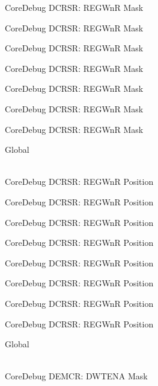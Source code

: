 \begin{DoxyRefList}
\label{deprecated__deprecated000130}%
%
Core\+Debug DCRSR\+: REGWnR Mask 

\label{deprecated__deprecated000186}%
%
Core\+Debug DCRSR\+: REGWnR Mask 

\label{deprecated__deprecated000269}%
%
Core\+Debug DCRSR\+: REGWnR Mask 

\label{deprecated__deprecated000328}%
%
Core\+Debug DCRSR\+: REGWnR Mask 

\label{deprecated__deprecated000404}%
%
Core\+Debug DCRSR\+: REGWnR Mask 

\label{deprecated__deprecated000493}%
%
Core\+Debug DCRSR\+: REGWnR Mask 

\label{deprecated__deprecated000595}%
%
Core\+Debug DCRSR\+: REGWnR Mask  
\item[{\parbox[t]{\linewidth}{Global \doxylink{group___c_m_s_i_s___core_debug_ga51e75942fc0614bc9bb2c0e96fcdda9a}{Core\+Debug\+\_\+\+DCRSR\+\_\+\+REGWn\+R\+\_\+\+Pos} }}]\hfill \\
\label{deprecated__deprecated000041}%
%
Core\+Debug DCRSR\+: REGWnR Position 

\label{deprecated__deprecated000129}%
%
Core\+Debug DCRSR\+: REGWnR Position 

\label{deprecated__deprecated000185}%
%
Core\+Debug DCRSR\+: REGWnR Position 

\label{deprecated__deprecated000268}%
%
Core\+Debug DCRSR\+: REGWnR Position 

\label{deprecated__deprecated000327}%
%
Core\+Debug DCRSR\+: REGWnR Position 

\label{deprecated__deprecated000403}%
%
Core\+Debug DCRSR\+: REGWnR Position 

\label{deprecated__deprecated000492}%
%
Core\+Debug DCRSR\+: REGWnR Position 

\label{deprecated__deprecated000594}%
%
Core\+Debug DCRSR\+: REGWnR Position  
\item[{\parbox[t]{\linewidth}{Global \doxylink{group___c_m_s_i_s___core_debug_ga2fcc0b8f174e85379d38e1cb74b8c627}{Core\+Debug\+\_\+\+DEMCR\+\_\+\+DWTENA\+\_\+\+Msk} }}]\hfill \\
\label{deprecated__deprecated000134}%
%
Core\+Debug DEMCR\+: DWTENA Mask 


\end{DoxyRefList}
